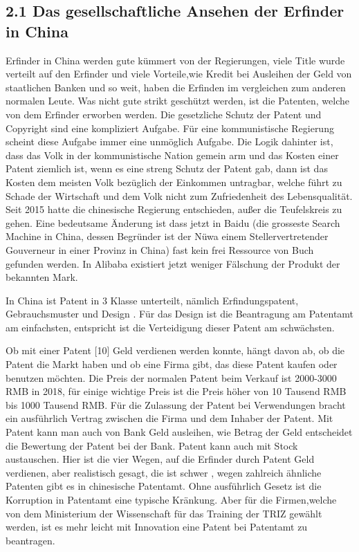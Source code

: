 \documentclass[11pt,a4paper]{article}
\begin{document}
\subsection{2.1 Das gesellschaftliche Ansehen der Erfinder in China}

Erfinder in China werden gute kümmert von der Regierungen, viele Title wurde
verteilt auf den Erfinder und viele Vorteile,wie Kredit bei Ausleihen der Geld
von staatlichen Banken und so weit, haben die Erfinden im vergleichen zum
anderen normalen Leute. Was nicht gute strikt geschützt werden, ist die
Patenten, welche von dem Erfinder erworben werden. Die gesetzliche Schutz der
Patent und Copyright sind eine kompliziert Aufgabe. Für eine kommunistische
Regierung scheint diese Aufgabe immer eine unmöglich Aufgabe. Die Logik
dahinter ist, dass das Volk in der kommunistische Nation gemein arm und das
Kosten einer Patent ziemlich ist, wenn es eine streng Schutz der Patent gab,
dann ist das Kosten dem meisten Volk bezüglich der Einkommen untragbar, welche
führt zu Schade der Wirtschaft und dem Volk nicht zum Zufriedenheit des
Lebensqualität. Seit 2015 hatte die chinesische Regierung entschieden, außer
die Teufelskreis zu gehen. Eine bedeutsame Änderung ist dass jetzt in
Baidu (die grosseste Search Machine in China, dessen Begründer ist der Nüwa
einem Stellervertretender Gouverneur in einer Provinz in China) fast kein frei
Ressource von Buch gefunden werden. In Alibaba existiert jetzt weniger
Fälschung der Produkt der bekannten Mark.

In China ist Patent in 3 Klasse unterteilt, nämlich Erfindungspatent,
Gebrauchsmuster und Design . Für das Design ist die Beantragung am Patentamt
am einfachsten, entspricht ist die Verteidigung dieser Patent am schwächsten.

Ob mit einer Patent [10] Geld verdienen werden konnte, hängt davon ab, ob die
Patent die Markt haben und ob eine Firma gibt, das diese Patent kaufen oder
benutzen möchten. Die Preis der normalen Patent beim Verkauf ist 2000-3000 RMB
in 2018, für einige wichtige Preis ist die Preis höher von 10 Tausend RMB bis
1000 Tausend RMB. Für die Zulassung der Patent bei Verwendungen bracht ein
ausführlich Vertrag zwischen die Firma und dem Inhaber der Patent. Mit Patent
kann man auch von Bank Geld ausleihen, wie Betrag der Geld entscheidet die
Bewertung der Patent bei der Bank. Patent kann auch mit Stock
austauschen. Hier ist die vier Wegen, auf die Erfinder durch Patent Geld
verdienen, aber realistisch gesagt, die ist schwer , wegen zahlreich ähnliche
Patenten gibt es in chinesische Patentamt. Ohne ausführlich Gesetz ist die
Korruption in Patentamt eine typische Kränkung. Aber für die Firmen,welche von
dem Ministerium der Wissenschaft für das Training der TRIZ gewählt werden,
ist es mehr leicht mit Innovation eine Patent bei Patentamt zu beantragen.
\end{document}
